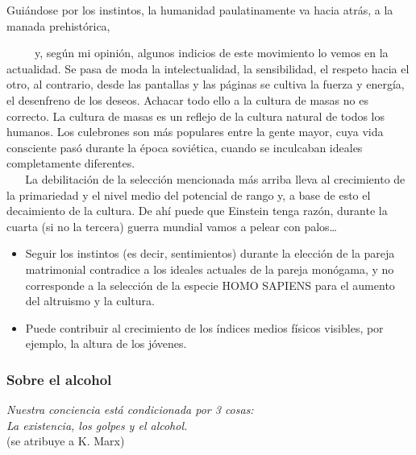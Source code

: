 \begin{tcolorbox}
 Guiándose por los instintos, la humanidad paulatinamente va hacia atrás,
a la manada prehistórica,
\end{tcolorbox}

~ ~ ~ y, según mi opinión, algunos indicios de este movimiento lo vemos
en la actualidad. Se pasa de moda la intelectualidad, la sensibilidad,
el respeto hacia el otro, al contrario, desde las pantallas y las
páginas se cultiva la fuerza y energía, el desenfreno de los deseos.
Achacar todo ello a la cultura de masas no es correcto. La cultura de
masas es un reflejo de la cultura natural de todos los humanos. Los
culebrones son más populares entre la gente mayor, cuya vida consciente
pasó durante la época soviética, cuando se inculcaban ideales
completamente diferentes.\\
\hspace*{0.333em} ~ ~ La debilitación de la selección mencionada más
arriba lleva al crecimiento de la primariedad y el nivel medio del
potencial de rango y, a base de esto el decaimiento de la cultura. De
ahí puede que Einstein tenga razón, durante la cuarta (si no la tercera)
guerra mundial vamos a pelear con palos\ldots{}

\begin{itemize}

\item
  Seguir los instintos (es decir, sentimientos) durante la elección de
  la pareja matrimonial contradice a los ideales actuales de la pareja
  monógama, y no corresponde a la selección de la especie HOMO SAPIENS
  para el aumento del altruismo y la cultura.
\item
  Puede contribuir al crecimiento de los índices medios físicos
  visibles, por ejemplo, la altura de los jóvenes.
\end{itemize}

\protect\hypertarget{M12}{}{}

\hypertarget{sobre-el-alcohol}{\subsubsection{Sobre el alcohol}\label{sobre-el-alcohol}}

\noindent
\textit{Nuestra conciencia está condicionada por 3 cosas:}\\
\textit{La existencia, los golpes y el alcohol.}\\
(se atribuye a K. Marx)\\



